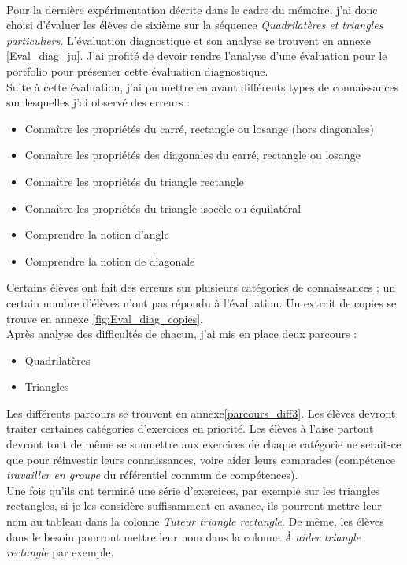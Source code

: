\paragraph{} Pour la dernière expérimentation décrite dans le cadre du mémoire, j'ai donc choisi d'évaluer les élèves de sixième sur la séquence \textit{Quadrilatères et triangles particuliers}. L'évaluation diagnostique et son analyse se trouvent en annexe \ref{Eval_diag_ju}. J'ai profité de devoir rendre l'analyse d'une évaluation pour le portfolio pour présenter cette évaluation diagnostique.\\
Suite à cette évaluation, j'ai pu mettre en avant différents types de connaissances sur lesquelles j'ai observé des erreurs :
\begin{itemize}
	\item Connaître les propriétés du carré, rectangle ou losange (hors diagonales)
	\item Connaître les propriétés des diagonales du carré, rectangle ou losange
	\item Connaître les propriétés du triangle rectangle
	\item Connaître les propriétés du triangle isocèle ou équilatéral
	\item Comprendre la notion d'angle
	\item Comprendre la notion de diagonale
\end{itemize}
Certains élèves ont fait des erreurs sur plusieurs catégories de connaissances ; un certain nombre d'élèves n'ont pas répondu à l'évaluation. Un extrait de copies se trouve en annexe \ref{fig:Eval_diag_copies}.\\
Après analyse des difficultés de chacun, j'ai mis en place deux parcours :
\begin{itemize}
\item Quadrilatères
\item Triangles
\end{itemize}
Les différents parcours se trouvent en annexe\ref{parcours_diff3}. Les élèves devront traiter certaines catégories d'exercices en priorité.
Les élèves à l'aise partout devront tout de même se soumettre aux exercices de chaque catégorie ne serait-ce que pour réinvestir leurs connaissances, voire aider leurs camarades (compétence \textit{travailler en groupe} du référentiel commun de compétences).\\
Une fois qu'ils ont terminé une série d'exercices, par exemple sur les triangles rectangles, si je les considère suffisamment en avance, ils pourront mettre leur nom au tableau dans la colonne \textit{Tuteur triangle rectangle}. De même, les élèves dans le besoin pourront mettre leur nom dans la colonne \textit{À aider triangle rectangle} par exemple.\\

